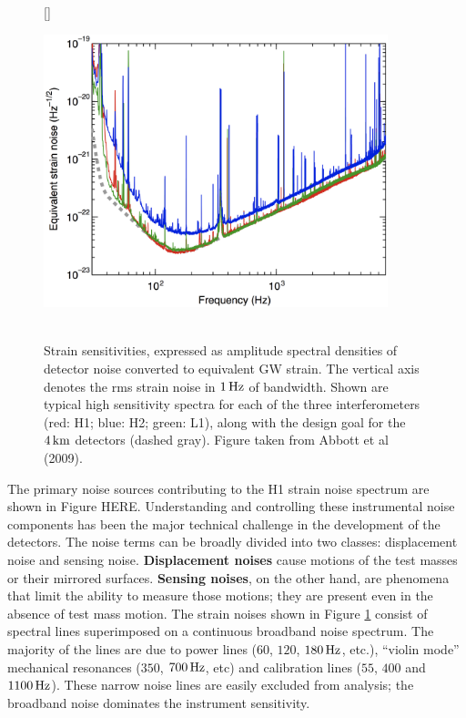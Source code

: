 \documentclass[a4paper,10pt]{article}
\begin{document}
\begin{figure}[h]
    [\FBwidth]
    {\caption{\footnotesize{\\Strain sensitivities, expressed as amplitude spectral densities of detector noise converted to equivalent GW strain. The vertical axis denotes the rms strain noise in $1\,{\rm Hz}$ of bandwidth. Shown are typical high sensitivity spectra for each of the three interferometers (red: H1; blue: H2; green: L1), along with the design goal for the $4\,{\rm km}$ detectors (dashed gray). Figure taken from Abbott et al (2009).}}
    \label{fig:strainnoise}}
    {\includegraphics[width=10cm]{figures/StrainNoise.png}}
\end{figure}

{\noindent}The primary noise sources contributing to the H1 strain noise spectrum are shown in Figure HERE. Understanding and controlling these instrumental noise components has been the major technical challenge in the development of the detectors. The noise terms can be broadly divided into two classes: displacement noise and sensing noise. \textbf{Displacement noises} cause motions of the test masses or their mirrored surfaces. \textbf{Sensing noises}, on the other hand, are phenomena that limit the ability to measure those motions; they are present even in the absence of test mass motion. The strain noises shown in Figure \ref{fig:strainnoise} consist of spectral lines superimposed on a continuous broadband noise spectrum. The majority of the lines are due to power lines ($60$, $120$, $180\,{\rm Hz}$, etc.), ``violin mode'' mechanical resonances ($350$, $700\,{\rm Hz}$, etc) and calibration lines ($55$, $400$ and $1100\,{\rm Hz}$). These narrow noise lines are easily excluded from analysis; the broadband noise dominates the instrument sensitivity.
\end{document}
